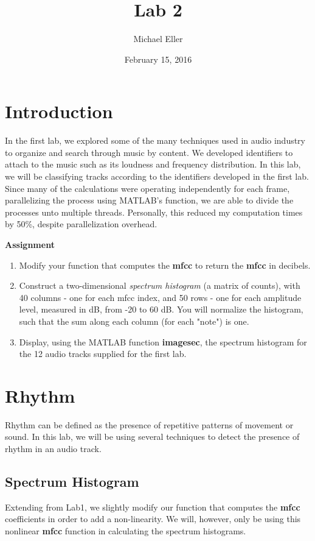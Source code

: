 \documentclass{article} %
\title{Lab 2}
\author{Michael Eller}
\date{February 15, 2016} %
\begin{document}
\maketitle

\section{Introduction}
In the first lab, we explored some of the many techniques used in audio industry to organize and search through music by content. We developed identifiers to
attach to the music such as its loudness and frequency distribution. In this lab, we will be classifying tracks according to the identifiers developed in the first lab. 
Since many of the calculations were operating independently for each frame, parallelizing the process using MATLAB's  function, we are able
to divide the processes unto multiple threads. Personally, this reduced my computation times by 50\%, despite parallelization overhead. 

\begin{framed}
\textbf{Assignment}
\begin{enumerate}
\item Modify your function that computes the \textbf{mfcc} to return the \textbf{mfcc} in decibels. 
\item Construct a two-dimensional \emph{spectrum histogram} (a matrix of counts), with 40 columns - one for each mfcc index, and 50 rows - one
for each amplitude level, measured in dB, from -20 to 60 dB. You will normalize the histogram, such that the sum along each column (for each "note") is one.
\item Display, using the MATLAB function \textbf{imagesec}, the spectrum histogram for the 12 audio tracks supplied for the first lab. 
\end{enumerate}
\end{framed}

\section{Rhythm}
Rhythm can be defined as the presence of repetitive patterns of movement or sound. In this lab, we will be using several techniques to detect the presence
of rhythm in an audio track.

\subsection{Spectrum Histogram}
Extending from Lab1, we slightly modify our function that computes the \textbf{mfcc} coefficients in order to add a non-linearity. We will, however, only be using
this nonlinear \textbf{mfcc} function in calculating the spectrum histograms. 
\end{document}
